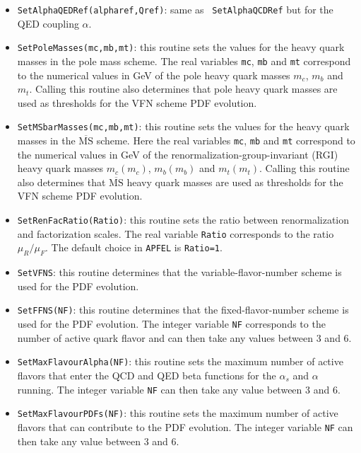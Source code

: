 \documentclass[11pt,a4paper]{article}
\newcommand{\MSbar}{\overline{\mathrm{MS}}}
\begin{document}
\begin{itemize}
\item {\tt SetAlphaQEDRef(alpharef,Qref)}: same as {\tt
    SetAlphaQCDRef} but for the QED coupling $\alpha$.

\item {\tt SetPoleMasses(mc,mb,mt)}: this routine sets the values for
  the heavy quark masses in the pole mass scheme. The real variables {\tt mc},
 {\tt mb} and {\tt mt} correspond to the numerical values in GeV of the pole heavy quark masses
 $m_c$, $m_b$ and $m_t$. Calling this routine also determines that
 pole heavy quark masses are used as thresholds for the VFN scheme PDF evolution.
 
\item {\tt SetMSbarMasses(mc,mb,mt)}: this routine sets the values for
  the heavy quark masses in the $\MSbar$  scheme. Here the real variables {\tt mc},
 {\tt mb} and {\tt mt} correspond to the numerical values in GeV of the 
renormalization-group-invariant (RGI) heavy quark masses
$m_c(m_c)$, $m_b(m_b)$ and $m_t(m_t)$. Calling this routine also
determines that $\MSbar$ heavy quark masses are used as thresholds for
the VFN scheme PDF evolution.

\item {\tt SetRenFacRatio(Ratio)}: this routine sets the ratio between
  renormalization and factorization scales. The real variable {\tt Ratio}
  corresponds to the ratio $\mu_R / \mu_F$.
%
The default choice in {\tt APFEL} is {\tt Ratio=1}.
%

\item {\tt SetVFNS}: this routine determines that the
  variable-flavor-number scheme is used  for the PDF evolution.

\item {\tt SetFFNS(NF)}: this routine determines that the
  fixed-flavor-number scheme is used  for the PDF evolution. The
  integer variable {\tt NF} corresponds to the number
  of active quark flavor and can then take any values between 3 and 6.

\item {\tt SetMaxFlavourAlpha(NF)}: this routine sets the maximum
  number of active flavors that enter the QCD and QED beta functions
  for the $\alpha_s$ and $\alpha$
  running. The integer variable {\tt NF} can then take any value
  between 3 and 6.

\item {\tt SetMaxFlavourPDFs(NF)}: this routine sets the maximum
  number of active flavors that can contribute to the PDF
  evolution. The integer variable {\tt NF} can then take any value
  between 3 and 6.


\end{itemize}
\end{document}
